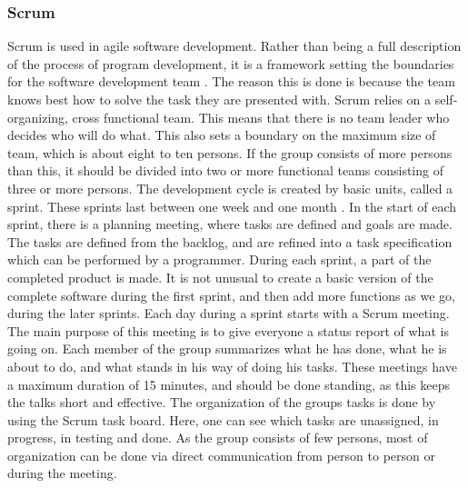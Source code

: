 \subsubsection{Scrum}
Scrum is used in agile software development. Rather than being a full description of the process of program development, it is a framework setting the boundaries for the software development team \cite{bib:asdas}. The reason this is done is because the team knows best how to solve the task they are presented with.
\newline
\newline
Scrum relies on a self-organizing, cross functional team. This means that there is no team leader who decides who will do what. This also sets a boundary on the maximum size of team, which is about eight to ten persons. If the group consists of more persons than this, it should be divided into two or more functional teams consisting of three or more persons.
\newline
\newline
The development cycle is created by basic units, called a sprint. These sprints last between one week and one month \cite{bib:scrum}. In the start of each sprint, there is a planning meeting, where tasks are defined and goals are made. The tasks are defined from the backlog, and are refined into a task specification which can be performed by a programmer. During each sprint, a part of the completed product is made. It is not unusual to create a basic version of the complete software during the first sprint, and then add more functions as we go, during the later sprints.
\newline
\newline
Each day during a sprint starts with a Scrum meeting. The main purpose of this meeting is to give everyone a status report of what is going on. Each member of the group summarizes what he has done, what he is about to do, and what stands in his way of doing his tasks. These meetings have a maximum duration of 15 minutes, and should be done standing, as this keeps the talks short and effective.
\newline
\newline
The organization of the groups tasks is done by using the Scrum task board. Here, one can see which tasks are unassigned, in progress, in testing and done. As the group consists of few persons, most of organization can be done via direct communication from person to person or during the meeting.


